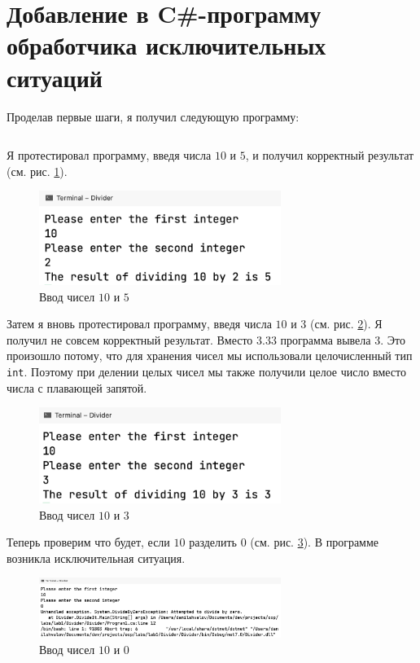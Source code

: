 \documentclass[a4paper,14pt]{extarticle}
\numberwithin{figure}{section}
\begin{document}
\section{Добавление в C\#-программу обработчика исключительных ситуаций}

Проделав первые шаги, я получил следующую программу:
\inputminted{csharp}{../Divider/Divider/Program1.cs}

Я протестировал программу, введя числа \(10\) и \(5\), и получил корректный результат (см. рис. \ref{fig:task-4-1}).

\begin{figure}[H]
    \centering
    \includegraphics[width=0.7\textwidth]{images/task-4-1.png}
    \caption{Ввод чисел \(10\) и \(5\)}
    \label{fig:task-4-1}
\end{figure}

Затем я вновь протестировал программу, введя числа \(10\) и \(3\) (см. рис. \ref{fig:task-4-2}). Я получил не совсем корректный результат. Вместо \(3.33\) программа вывела \(3\). Это произошло потому, что для хранения чисел мы использовали целочисленный тип \texttt{int}. Поэтому при делении целых чисел мы также получили целое число вместо числа с плавающей запятой.

\begin{figure}[H]
    \centering
    \includegraphics[width=0.7\textwidth]{images/task-4-2.png}
    \caption{Ввод чисел \(10\) и \(3\)}
    \label{fig:task-4-2}
\end{figure}

Теперь проверим что будет, если \(10\) разделить \(0\) (см. рис. \ref{fig:task-4-3}). В программе возникла исключительная ситуация.

\begin{figure}[H]
    \centering
    \includegraphics[width=0.7\textwidth]{images/task-4-3.png}
    \caption{Ввод чисел \(10\) и \(0\)}
    \label{fig:task-4-3}
\end{figure}
\end{document}
